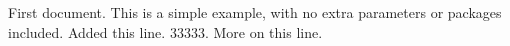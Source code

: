 \documentclass{article}
\begin{document}
First document. This is a simple example, with no 
extra parameters or packages included.
Added this line.
33333.
More on this line.
\end{document}
